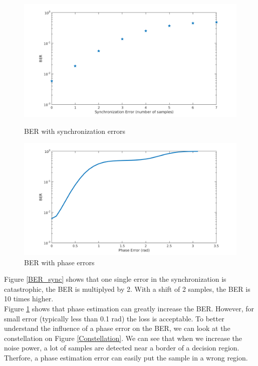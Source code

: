 \documentclass[a4paper,12pt]{article}
\begin{document}
\begin{figure}[ht]
\begin{minipage}[c]{.45\linewidth}
\begin{center}
\includegraphics[scale=0.35]{BER_SyncError.png}
\caption{BER with synchronization errors}
\label{BER_sync}
\end{center}
\end{minipage}
\hfill
\begin{minipage}[c]{.45\linewidth}
\begin{center}
\includegraphics[scale=0.35]{BER_PhaseError.png}
\caption{BER with phase errors}
\label{BER_phase}
\end{center}
\end{minipage}
\end{figure}

Figure \ref{BER_sync} shows that one single error in the synchronization is catastrophic, the BER is multiplyed by 2. With a shift of 2 samples, the BER is 10 times higher.\\

Figure \ref{BER_phase} shows that phase estimation can greatly increase the BER. However, for small error (typically less than 0.1 rad) the loss is acceptable. To better understand the influence of a phase error on the BER, we can look at the constellation on Figure \ref{Constellation}. We can see that when we increase the noise power, a lot of samples are detected near a border of a decision region. Therfore, a phase estimation error can easily put the sample in a wrong region.
\end{document}
